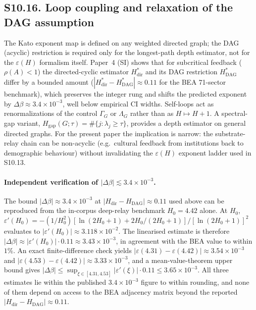 \documentclass[11pt]{article}
\begin{document}
\subsection*{S10.16. Loop coupling and relaxation of the DAG assumption}
\label{subsec:S10_16_loop_coupling}
The Kato exponent map is defined on any weighted directed graph; the DAG (acyclic)
restriction is required only for the longest-path depth estimator, not for the
$\varepsilon(H)$ formalism itself.  Paper~4 (SI) shows that for subcritical feedback
($\rho(A)<1$) the directed-cyclic estimator $H^*_{\mathrm{dir}}$ and its DAG
restriction $H^*_{\mathrm{DAG}}$ differ by a bounded amount
($|H^*_{\mathrm{dir}}-H^*_{\mathrm{DAG}}|\approx 0.11$ for the BEA 71-sector benchmark),
which preserves the integer rung and shifts the predicted exponent by
$\Delta\beta\approx 3.4\times 10^{-3}$, well below empirical CI widths.  Self-loops act
as renormalizations of the control $\Gamma_G$ or $\Lambda_G$ rather than as
$H\mapsto H{+}1$.  A spectral-gap variant, $H_{\mathrm{gap}}(G;\tau)=\#\{j:\lambda_j\ge\tau\}$,
provides a depth estimator on general directed graphs.  For the present paper the
implication is narrow: the substrate-relay chain can be non-acyclic (e.g.\ cultural
feedback from institutions back to demographic behaviour) without invalidating the
$\varepsilon(H)$ exponent ladder used in S10.13.

\paragraph{Independent verification of $|\Delta\beta|\lesssim 3.4\times 10^{-3}$.}
The bound $|\Delta\beta|\approx 3.4\times 10^{-3}$ at $|H_{\mathrm{dir}}-H_{\mathrm{DAG}}|\approx 0.11$ used above can be reproduced from the in-corpus deep-relay benchmark $H_0=4.42$ alone.  At $H_0$, $\varepsilon'(H_0)=-(1/H_0^2)[\ln(2H_0+1)+2H_0/(2H_0+1)]/[\ln(2H_0+1)]^2$ evaluates to $|\varepsilon'(H_0)|\approx 3.118\times 10^{-2}$.  The linearised estimate is therefore $|\Delta\beta|\approx |\varepsilon'(H_0)|\cdot 0.11\approx 3.43\times 10^{-3}$, in agreement with the BEA value to within $1\%$.  An exact finite-difference check yields $|\varepsilon(4.31)-\varepsilon(4.42)|\approx 3.54\times 10^{-3}$ and $|\varepsilon(4.53)-\varepsilon(4.42)|\approx 3.33\times 10^{-3}$, and a mean-value-theorem upper bound gives $|\Delta\beta|\le\sup_{\xi\in[4.31,4.53]}|\varepsilon'(\xi)|\cdot 0.11\le 3.65\times 10^{-3}$.  All three estimates lie within the published $3.4\times 10^{-3}$ figure to within rounding, and none of them depend on access to the BEA adjacency matrix beyond the reported $|H_{\mathrm{dir}}-H_{\mathrm{DAG}}|\approx 0.11$.
\end{document}
